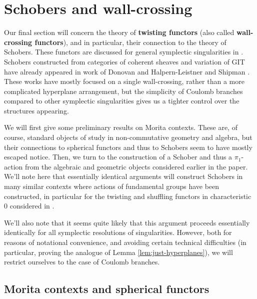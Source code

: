 \section{Schobers and wall-crossing}
\label{sec:schob-wall-cross}

Our final section will concern the theory of {\bf twisting functors} (also called {\bf wall-crossing functors}), and in particular, their connection to the theory of Schobers.  These functors are discussed for general symplectic singularities in \cite[\S 2.5.1]{losev2017modular}.  Schobers constructed from categories of coherent sheaves and variation of GIT have already appeared in work of Donovan \cite{donovan2017perverse} and Halpern-Leistner and Shipman \cite{HLS}.  These works have mostly focused on a single wall-crossing, rather than a more complicated hyperplane arrangement, but the simplicity of Coulomb branches compared to other symplectic singularities gives us a tighter control over the structures appearing.  

We will first give some preliminary results on Morita contexts.  These are, of course, standard objects of study in non-commutative geometry and algebra, but their connections to spherical functors and thus to Schobers seem to have mostly escaped notice.  Then, we turn to the construction of a Schober and thus a $\pi_1$-action from the algebraic and geometric objects considered earlier in the paper.  We'll note here that essentially identical arguments will construct Schobers in many similar contexts where actions of fundamental groups have been constructed, in particular for the twisting and shuffling functors in characteristic 0 considered in \cite{BLPWquant,BLPWgco}.

We'll also note that it seems quite likely that this argument proceeds essentially identically for all symplectic resolutions of singularities.  However, both for reasons of notational convenience, and avoiding certain technical difficulties (in particular, proving the analogue of Lemma \ref{lem:just-hyperplanes}), we will restrict ourselves to the case of Coulomb branches. 

 \subsection{Morita contexts and spherical functors}
\label{sec:morita-cont-spher}

